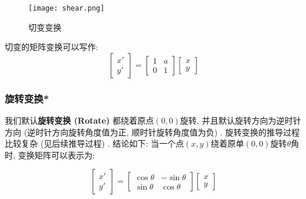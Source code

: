 \begin{figure}[H]
	\centering
	\texttt{[image: shear.png]}
	\caption{切变变换}
\end{figure}

切变的矩阵变换可以写作: 
\begin{equation}
	\begin{bmatrix}x'\\y'\end{bmatrix}=\begin{bmatrix}1&a\\0&1\end{bmatrix}\begin{bmatrix}x\\y\end{bmatrix}
\end{equation}

\subsubsection{旋转变换*}

我们默认\textbf{旋转变换 (Rotate) }都绕着原点$(0,0)$旋转, 并且默认旋转方向为逆时针方向 (逆时针方向旋转角度值为正, 顺时针旋转角度值为负) . 旋转变换的推导过程比较复杂 (见后续推导过程) . 结论如下: 当一个点$(x,y)$绕着原单$(0,0)$旋转$\theta$角时, 变换矩阵可以表示为: 

\begin{equation}
	\begin{bmatrix}x'\\y'\end{bmatrix}=\begin{bmatrix}\cos\theta&-\sin\theta\\\sin\theta&\cos\theta\end{bmatrix}\begin{bmatrix}x\\y\end{bmatrix}
\end{equation}

